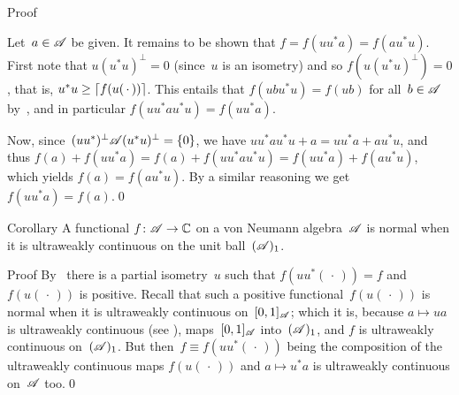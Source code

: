 \documentclass[a]{subfiles}
\begin{document}
\begin{parsec}
\begin{point}
\begin{point}{Proof}
\begin{point}
Let~$a\in\mathscr{A}$ be given.
It remains to be shown that $f=f(uu^*a)=f(au^*u)$.
First note that  $u(u^*u)^\perp = 0$ (since~$u$ is an isometry)
and so $f(u(u^*u)^\perp)=0$,
that is,  $u^*u\geq \left\lceil f(u(\,\cdot\,))\right\rceil$.
This entails that $f(ubu^*u)=f(ub)$ for all~$b\in\mathscr{A}$
by~\TODO{}, and in particular $f(uu^*au^*u)=f(uu^*a)$.

Now, since~$(uu^*)^\perp\mathscr{A}(u^*u)^\perp = \{0\}$,
we have $uu^* a u^*u + a = uu^*a + au^*u$,
and thus $f(a)+f(uu^*a)=f(a)+f(uu^*au^*u)=f(uu^*a)+f(au^*u)$,
which yields $f(a)=f(au^*u)$.
By a similar reasoning we get $f(uu^*a)=f(a)$.\qed
\end{point}
\end{point}
\end{point}
\begin{point}{Corollary}%
A functional $f\colon \mathscr{A}\to\mathbb{C}$
on a von Neumann algebra~$\mathscr{A}$
is normal
when it is ultraweakly continuous
on the unit ball~$(\mathscr{A})_1$.
\begin{point}{Proof}%
By~
there is a partial isometry~$u$
such that $f(uu^*(\,\cdot\,))=f$
and~$f(u(\,\cdot\,))$ is positive.
Recall \TODO{} that such a positive functional~$f(u(\,\cdot\,))$
is normal when it is ultraweakly continuous
on~$[0,1]_{\mathscr{A}}$;
which it is, 
because $a\mapsto ua$ is ultraweakly continuous (see ),
maps~$[0,1]_{\mathscr{A}}$ into~$(\mathscr{A})_1$,
and $f$ is ultraweakly continuous on~$(\mathscr{A})_1$.
But then~$f\equiv f(uu^*(\,\cdot\,))$
being the composition of the ultraweakly continuous maps
$f(u(\,\cdot\,))$ and $a\mapsto u^*a$ 
is ultraweakly continuous on~$\mathscr{A}$ too.\qed
\end{point}
\end{point}
\end{parsec}
\end{document}

